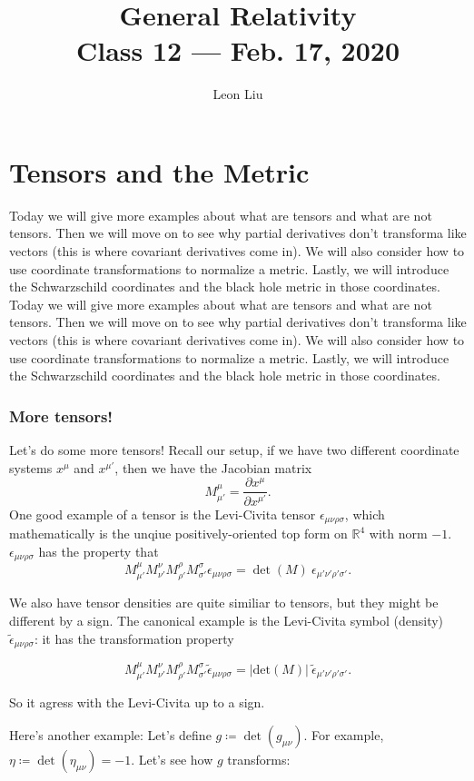 \documentclass[10pt]{article}
\title{{\Huge General Relativity}\\{\Large{Class 12 --- Feb. 17, 2020}}} %
\author{Leon Liu}
\newcommand{\xm}{x^\mu}
\newcommand{\xmp}{x^{\mu'}}
\newcommand{\epu}{\epsilon_{\mu \nu \rho \sigma}}
\newcommand{\epup}{\epsilon_{\mu' \nu' \rho' \sigma'}}
\newcommand{\eput}{\tilde{\epsilon}_{\mu \nu \rho \sigma}}
\newcommand{\epupt}{\tilde{\epsilon}_{\mu' \nu' \rho' \sigma'}}
\newcommand{\gmn}{g_{\mu \nu}}
\newcommand{\Det}{\text{det}}
\begin{document}
    \maketitle
    \flushbottom
    \newpage
    \pagestyle{fancynotes}
    \part{Tensors and the Metric}

Today we will give more examples about what are tensors and what are not tensors. Then we will move on to see why partial derivatives don't transforma like vectors (this is where covariant derivatives come in). We will also consider how to use coordinate transformations to normalize a metric. Lastly, we will introduce the Schwarzschild coordinates and the black hole metric in those coordinates.
Today we will give more examples about what are tensors and what are not tensors. Then we will move on to see why partial derivatives don't transforma like vectors (this is where covariant derivatives come in). We will also consider how to use coordinate transformations to normalize a metric. Lastly, we will introduce the Schwarzschild coordinates and the black hole metric in those coordinates.
    

\section{More tensors!}\label{sec:class_style}


Let's do some more tensors! Recall our setup, if we have two different coordinate systems $x^\mu$ and $\xmp$, then we have the Jacobian matrix $$M^\mu _{\mu'} = \frac {\partial \xm}{\partial \xmp}.$$ One good example of a tensor is the Levi-Civita tensor $\epu$, which mathematically is the unqiue positively-oriented top form on $\mathbb{R}^4$ with norm $-1$. $\epu$ has the property that $$M^{\mu}_{\mu'} M^{\nu}_{\nu'} M^{\rho}_{\rho'} M^{\sigma}_{\sigma'} \epu = \det (M) \  \epup.$$


We also have tensor densities are quite similiar to tensors, but they might be different by a sign. The canonical example is the Levi-Civita symbol (density) $\eput$: it has the transformation property 

$$M^{\mu}_{\mu'} M^{\nu}_{\nu'} M^{\rho}_{\rho'} M^{\sigma}_{\sigma'} \eput = |\Det (M)| \  \epupt.$$

So it agress with the Levi-Civita up to a sign. 

Here's another example: Let's define $g \coloneqq \det (\gmn)$. For example, $\eta \coloneqq \det(\eta_{\mu \nu}) = -1$. Let's see how $g$ transforms:
\end{document}
